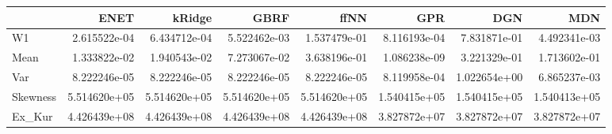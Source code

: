 \begin{tabular}{lrrrrrrr}
\toprule
{} &          ENET &        kRidge &          GBRF &          ffNN &           GPR &           DGN &           MDN \\
\midrule
W1       &  2.615522e-04 &  6.434712e-04 &  5.522462e-03 &  1.537479e-01 &  8.116193e-04 &  7.831871e-01 &  4.492341e-03 \\
Mean     &  1.333822e-02 &  1.940543e-02 &  7.273067e-02 &  3.638196e-01 &  1.086238e-09 &  3.221329e-01 &  1.713602e-01 \\
Var      &  8.222246e-05 &  8.222246e-05 &  8.222246e-05 &  8.222246e-05 &  8.119958e-04 &  1.022654e+00 &  6.865237e-03 \\
Skewness &  5.514620e+05 &  5.514620e+05 &  5.514620e+05 &  5.514620e+05 &  1.540415e+05 &  1.540415e+05 &  1.540413e+05 \\
Ex\_Kur   &  4.426439e+08 &  4.426439e+08 &  4.426439e+08 &  4.426439e+08 &  3.827872e+07 &  3.827872e+07 &  3.827872e+07 \\
\bottomrule
\end{tabular}

